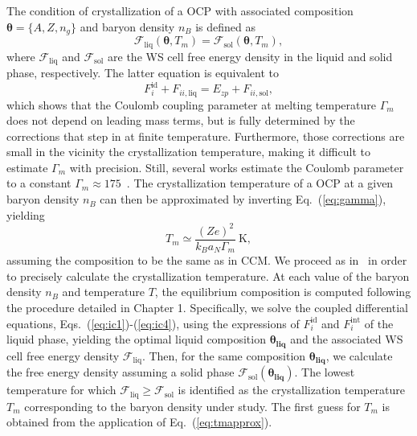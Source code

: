 The condition of crystallization of a OCP with {associated composition 
$\bm{\theta}=\{A,Z,n_g\}$ and baryon density $n_B$ is defined as}
%
\begin{equation}
  \mathcal{F}_{\text{liq}}(\bm{\theta}, T_m) 
  = \mathcal{F}_{\text{sol}}(\bm{\theta}, T_m),\label{eq:tmocp}
\end{equation}
%
where $\mathcal{F}_\text{liq}$ and $\mathcal{F}_\text{sol}$ are the WS cell
free energy density in the liquid and solid phase, respectively.
The latter equation is equivalent to
%
\begin{equation}
  F_i^{\text{id}} + F_{ii,\text{liq}} = E_{zp} + F_{ii,\text{sol}},
\end{equation}
%
which shows that the Coulomb coupling parameter at melting
temperature $\Gamma_m$ does not depend on leading mass terms, but is fully
determined by the corrections that step in at 
finite temperature. Furthermore, those corrections are small in the vicinity
the crystallization temperature, making it difficult to estimate $\Gamma_m$
with precision. Still, several works estimate the Coulomb parameter to 
a constant $\Gamma_m \approx 175$~\cite{VanHorn1969,Haensel2007}. 
The crystallization temperature of a OCP at a given baryon density $n_B$ 
can then be approximated by inverting Eq.~(\ref{eq:gamma}), yielding
%
\begin{equation}
  T_m \simeq \frac{(Ze)^2}{k_B a_N \Gamma_m} \ \text{K},\label{eq:tmapprox}
\end{equation}
%
assuming the composition to be the same as in CCM. 
%
We proceed as in~\cite{Fantina2020} in order to precisely calculate the 
crystallization temperature. At each value of the baryon density $n_B$ and 
temperature $T$, the equilibrium composition is computed following the 
procedure detailed in Chapter 1. Specifically, we solve the coupled 
differential equations, Eqs.~(\ref{eq:ic1})-(\ref{eq:ic4}), using the 
expressions of $F_{i}^{\text{id}}$ and $F_{i}^{\text{int}}$ of the liquid 
phase, yielding the optimal liquid composition $\bm{\theta_{\text{liq}}}$ and 
the associated WS cell free energy density $\mathcal{F}_{\text{liq}}$. Then, 
for the same composition $\bm{\theta_{\text{liq}}}$, we calculate the free 
energy density assuming a solid phase 
$\mathcal{F}_{\text{sol}}(\bm{\theta_{\text{liq}}})$. The lowest temperature 
for which $\mathcal{F}_{\text{liq}} \geq \mathcal{F}_{\text{sol}}$ is 
identified as the crystallization temperature $T_m$ corresponding to the 
baryon density under study. The first guess for $T_m$ is obtained from the
application of Eq.~(\ref{eq:tmapprox}).

